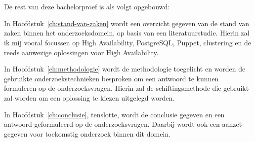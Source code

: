     \section{}
    \label{sec:opzet-bachelorproef}
    
    
    De rest van deze bachelorproef is als volgt opgebouwd:
    
    In Hoofdstuk~\ref{ch:stand-van-zaken} wordt een overzicht gegeven van de stand van zaken binnen het onderzoeksdomein, op basis van een literatuurstudie. Hierin zal ik mij vooral focussen op High Availability, PostgreSQL, Puppet, clustering en de reeds aanwezige oplossingen voor High Availability.
    
    In Hoofdstuk~\ref{ch:methodologie} wordt de methodologie toegelicht en worden de gebruikte onderzoekstechnieken besproken om een antwoord te kunnen formuleren op de onderzoeksvragen. Hierin zal de schiftingsmethode die gebruikt zal worden om een oplossing te kiezen uitgelegd worden.
    
    
    In Hoofdstuk~\ref{ch:conclusie}, tenslotte, wordt de conclusie gegeven en een antwoord geformuleerd op de onderzoeksvragen. Daarbij wordt ook een aanzet gegeven voor toekomstig onderzoek binnen dit domein.
